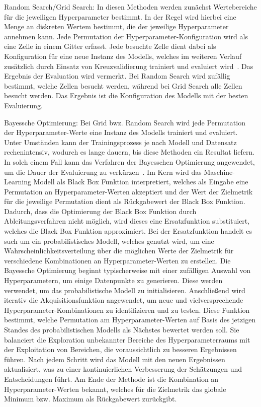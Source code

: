 \begin{description}
    \item Random Search/Grid Search: In diesen Methoden werden zunächst Wertebereiche für die jeweiligen Hyperparameter bestimmt. In der Regel wird hierbei eine Menge an diskreten Wertem bestimmt, die der jeweilige Hyperparameter annehmen kann. Jede Permutation der Hyperparameter-Konfiguration wird als eine Zelle in einem Gitter erfasst. 
    Jede besuchte Zelle dient dabei als Konfiguration für eine neue Instanz des Modells, welches im weiteren Verlauf zusätzlich durch Einsatz von Kreuzvalidierung trainiert und evaluiert wird~\cite[S. 3]{DBLP:journals/corr/abs-1912-06059}. Das Ergebnis der Evaluation wird vermerkt.
    Bei Random Search wird zufällig bestimmt, welche Zellen besucht werden, während bei Grid Search alle Zellen besucht werden. Das Ergebnis ist die Konfiguration des Modells mit der besten Evaluierung.
    
    \item Bayessche Optimierung: Bei Grid bwz. Random Search wird jede Permutation der Hyperparameter-Werte eine Instanz des Modells trainiert und evaluiert. Unter Umständen kann der Trainingsprozess je nach Modell und Datensatz rechenintensiv, wodurch es lange dauern, bis diese Methoden ein Resultat liefern.
    In solch einem Fall kann das Verfahren der Bayesschen Optimierung angewendet, um die Dauer der Evaluierung zu verkürzen~\cite[S. 2 - 3]{snoek2012practical}. Im Kern wird das Maschine-Learning Modell als Black Box Funktion interpretiert, welches als Eingabe eine Permutation an Hyperparameter-Werten akzeptiert und der Wert der Zielmetrik für die jeweilige Permutation dient als Rückgabewert der Black Box Funktion.
    Dadurch, dass die Optimierung der Black Box Funktion durch Ableitungsverfahren nicht möglich, wird dieses eine Ersatzfunktion substituiert, welches die Black Box Funktion approximiert.
    Bei der Ersatzfunktion handelt es such um ein probabilistisches Modell, welches genutzt wird, um eine Wahrscheinlichkeitsverteilung über die möglichen Werte der Zielmetrik für verschiedene Kombinationen an Hyperparameter-Werten zu erstellen.
    Die Bayessche Optimierung beginnt typischerweise mit einer zufälligen Auswahl von Hyperparametern, um einige Datenpunkte zu generieren. Diese werden verwendet, um das probabilistische Modell zu initialisieren. Anschließend wird iterativ die Akquisitionsfunktion angewendet, um neue und vielversprechende Hyperparameter-Kombinationen zu identifizieren und zu testen. 
    Diese Funktion bestimmt, welche Permutation am Hyperparameter-Werten auf Basis des jetzigen Standes des probabilistischen Modells als Nächstes bewertet werden soll. 
    Sie balanciert die Exploration unbekannter Bereiche des Hyperparameterraums mit der Exploitation von Bereichen, die voraussichtlich zu besseren Ergebnissen führen.
    Nach jedem Schritt wird das Modell mit den neuen Ergebnissen aktualisiert, was zu einer kontinuierlichen Verbesserung der Schätzungen und Entscheidungen führt. Am Ende der Methode ist die Kombination an Hyperparameter-Werten bekannt, welches für die Zielmetrik das globale Minimum bzw. Maximum als Rückgabewert zurückgibt.


\end{description}
